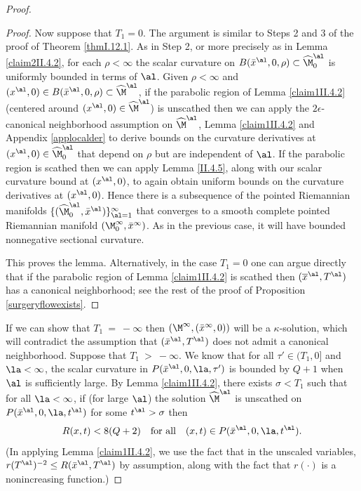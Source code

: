 \begin{proof}
\begin{proof}
Now suppose that $T_1 = 0$.
The argument is similar to Steps 2 and 3 of the proof of Theorem
\ref{thmI.12.1}.
As in Step 2,
or more precisely as in  Lemma \ref{claim2II.4.2},
for each $\rho < \infty$
the scalar curvature on
$B(\bar x^\al, 0, \rho) \subset \widehat\M^{\al}_0$
is uniformly bounded in terms of $\al$.
Given $\rho < \infty$ and
$(x^\al,0) \in B(\bar x^\al, 0, \rho) \subset \widehat\M^\al$,
if the parabolic region of
Lemma \ref{claim1II.4.2} (centered around
$(x^\al, 0) \in \widehat\M^\al$) is unscathed then we can
apply
the $2 \epsilon$-canonical neighborhood assumption
on $\widehat\M^\al$, Lemma \ref{claim1II.4.2} and Appendix \ref{applocalder}
to derive bounds on the curvature derivatives at
$(x^\al,0) \in \widehat\M^\al_0$
that depend on $\rho$ but are independent of $\al$.
If the parabolic region is scathed then we can apply Lemma
\ref{II.4.5}, along with our scalar curvature bound at
$(x^\al,0)$,
to again obtain uniform bounds on the curvature derivatives at
$(x^\al,0)$.
Hence there is a subsequence of
the pointed Riemannian manifolds
$\{(\widehat\M^\al_0, \bar x^\al)\}_{\al = 1}^\infty$
that converges to a smooth complete pointed
Riemannian manifold $(\M^\infty_0, \bar x^\infty)$.
As in the previous case, it will have
bounded nonnegative sectional curvature.

This proves the lemma.  Alternatively, in the case $T_1 = 0$
one can argue directly that if the parabolic region of
Lemma \ref{claim1II.4.2} is scathed then
$(\overline{x}^\al, T^\al)$ has a canonical neighborhood;
see the rest of the proof of Proposition \ref{surgeryflowexists}.
\end{proof}

If we can show that
$T_1 \: = \: -\infty$ then $(\M^\infty,(\bar x^\infty,0))$
will be a $\kappa$-solution, which will contradict the assumption
that $(\bar x^\al,T^\al)$ does not admit a canonical neighborhood.
Suppose that $T_1 \: > \: -\infty$.
We know that for all
$\tau' \in (T_1, 0]$
and $\la<\infty$, the scalar curvature in $P(\bar x^\al,0,\la,\tau')$
is bounded by $Q+1$ when $\al$ is sufficiently large.  By
Lemma \ref{claim1II.4.2}, there exists $\sigma< T_1$ such that for all
$\la<\infty$, if (for large $\al$)
the solution $\widehat\M^\al$ is unscathed on
$P(\bar x^\al,0,\la,t^\al)$ for some $t^\al > \sigma$ then
\begin{equation}
\label{2q+1}
R(x,t)< 8(Q+2)\quad\mbox{for all}\quad (x,t)\in P(\bar x^\al,0,\la,t^\al).
\end{equation}
(In applying Lemma \ref{claim1II.4.2}, we use the fact that in the unscaled
variables,
$r(T^\al)^{-2} \le R(\bar x^\al,T^\al)$ by assumption, along with
the fact that $r(\cdot)$ is a nonincreasing function.)



\end{proof}
